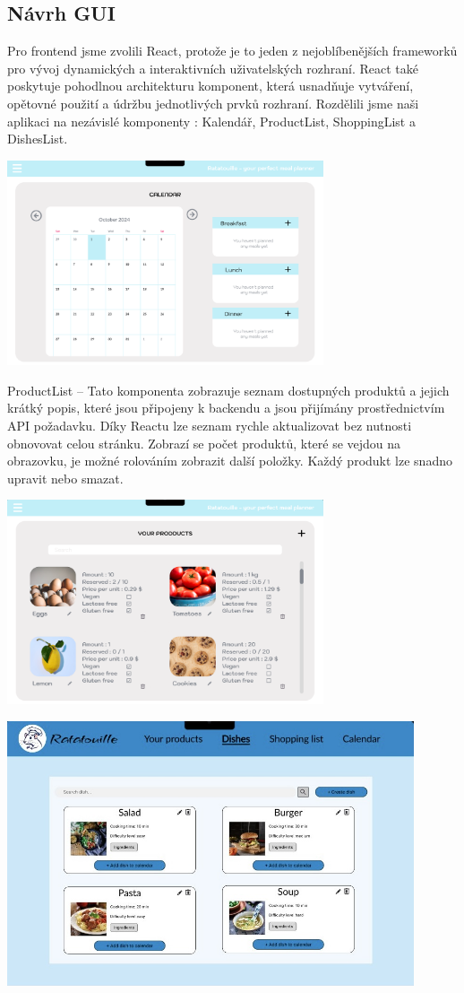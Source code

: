 \documentclass[a4paper,12pt]{article}
\begin{document}
\subsection*{Návrh GUI}
Pro frontend jsme zvolili React, protože je to jeden z nejoblíbenějších frameworků pro vývoj dynamických a interaktivních uživatelských rozhraní. 
React také poskytuje pohodlnou architekturu komponent, která usnadňuje vytváření, opětovné použití a údržbu jednotlivých prvků rozhraní. Rozdělili jsme naši aplikaci na nezávislé komponenty : Kalendář, ProductList, ShoppingList a DishesList.
\begin{center}
\includegraphics[width=0.7\textwidth]{figma_calendar.png}
\end{center}
ProductList – Tato komponenta zobrazuje seznam dostupných produktů a jejich krátký popis, které jsou připojeny k backendu a jsou přijímány prostřednictvím API požadavku. Díky Reactu lze seznam rychle aktualizovat bez nutnosti obnovovat celou stránku. Zobrazí se počet produktů, které se vejdou na obrazovku, je možné rolováním zobrazit další položky. Každý produkt lze snadno upravit nebo smazat.
\begin{center}
\includegraphics[width=0.7\textwidth]{figma_product.png}
\end{center}
\includegraphics[width=0.9\textwidth]{dishes.JPG}
\end{document}

